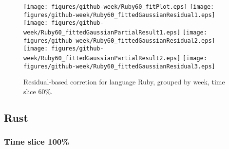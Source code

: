 \begin{figure}[hb]
\centering
{}
{\texttt{[image: figures/github-week/Ruby60\_fitPlot.eps]}}
{\texttt{[image: figures/github-week/Ruby60\_fittedGaussianResidual1.eps]}}
{\texttt{[image: figures/github-week/Ruby60\_fittedGaussianPartialResult1.eps]}}
{\texttt{[image: figures/github-week/Ruby60\_fittedGaussianResidual2.eps]}}
{\texttt{[image: figures/github-week/Ruby60\_fittedGaussianPartialResult2.eps]}}
{\texttt{[image: figures/github-week/Ruby60\_fittedGaussianResidual3.eps]}}
\caption{Residual-based corretion for language Ruby, grouped by week, time slice 60\%.}
\end{figure}


\clearpage 
\newpage 


\subsection{Rust}

\FloatBarrier

\subsubsection{Time slice 100\%}

